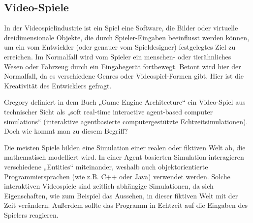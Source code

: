 \subsection{Video-Spiele}

In der Videospielindustrie ist ein Spiel eine Software, die Bilder oder virtuelle dreidimensionale Objekte, die durch Spieler-Eingaben beeinflusst werden können, um ein vom Entwickler (oder genauer vom Spieldesigner) festgelegtes Ziel zu erreichen. 
Im Normalfall wird vom Spieler ein menschen- oder tierähnliches Wesen oder Fahrzeug durch ein Eingabegerät fortbewegt. Betont wird hier der Normalfall, da es verschiedene Genres oder Videospiel-Formen gibt. Hier ist die Kreativität des Entwicklers gefragt.

Gregory definiert in dem Buch „Game Engine Architecture“ ein Video-Spiel aus technischer Sicht als „soft real-time interactive agent-based computer simulations“ \cite{gea}(interaktive agentbasierte computergestützte Echtzeitsimulationen).
Doch wie kommt man zu diesem Begriff?

Die meisten Spiele bilden eine Simulation einer realen oder fiktiven Welt ab, die mathematisch modelliert wird. In einer Agent basierten Simulation interagieren verschiedene „Entities“ miteinander, weshalb auch objektorientierte Programmiersprachen (wie z.B. C++ oder Java) verwendet werden.
Solche interaktiven Videospiele sind zeitlich abhängige Simulationen, da sich Eigenschaften, wie zum Beispiel das Aussehen, in dieser fiktiven Welt mit der Zeit verändern. Außerdem sollte das Programm in Echtzeit auf die Eingaben des Spielers reagieren.

